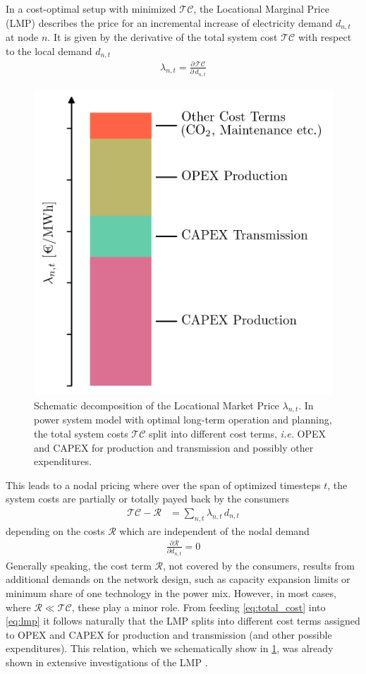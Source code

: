\documentclass[11pt,twocolumn]{article}
\newcommand{\ie}{\textit{i.e.} }
\newcommand{\pdv}[2]{\frac{\partial #1}{\partial #2}}
\newcommand{\lmp}[1][n]{\lambda_{#1,t}}
\newcommand{\demand}[1][n]{d_{#1,t}}
\newcommand{\totalcost}{\mathcal{TC}}
\newcommand{\remainingcost}{\mathcal{R}}
\begin{document}
In a cost-optimal setup with minimized $\totalcost$, the Locational Marginal Price (LMP) describes the price for an incremental increase of electricity demand $\demand$ at node $n$. It is given by the derivative of the total system cost $\totalcost$ with respect to the local demand $\demand$
\begin{align}
\lmp = \pdv{\,\totalcost}{\,\demand}
\label{eq:lmp}
\end{align}
% 
\begin{figure}[h]
\centering
\includegraphics[width=.8\linewidth]{price_decomposition.png}
\caption{Schematic decomposition of the Locational Market Price $\lmp$. In power system model with optimal long-term operation and planning, the total system costs $\totalcost$ split into different cost terms, \ie OPEX and CAPEX for production and transmission and possibly other expenditures. }
\label{fig:price_decomposition}
\end{figure}
% 
This leads to a nodal pricing where over the span of optimized timesteps $t$, the system costs are partially or totally payed back by the consumers 
\begin{align}
\totalcost - \remainingcost &=  \sum_{n,t} \lmp \, \demand
\label{eq:total_cost_reduced}
\end{align}
depending on the costs $\remainingcost$ which are independent of the nodal demand  
\begin{align}
 \pdv{\remainingcost}{\demand} = 0
\end{align}
% 
Generally speaking, the cost term $\remainingcost$, not covered by the consumers, results from additional demands on the network design, such as capacity expansion limits or minimum share of one technology in the power mix. However, in most cases, where $\remainingcost \ll  \totalcost$, these play a minor role. From feeding \cref{eq:total_cost} into \cref{eq:lmp} it follows naturally that the LMP splits into different cost terms assigned to OPEX and CAPEX for production and transmission (and other possible expenditures). This relation, which we schematically show in \cref{fig:price_decomposition}, was already shown in extensive investigations of the LMP \cite{schweppe_spot_1988}. 
\end{document}
